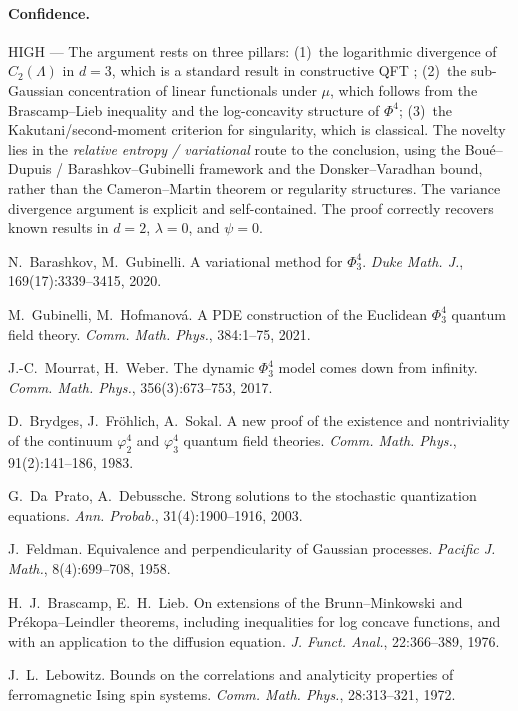 \paragraph{Confidence.} HIGH --- The argument rests on three pillars:
(1)~the logarithmic divergence of $C_2(\Lambda)$ in $d=3$, which is a standard
result in constructive QFT \cite{GH21,BFS83};
(2)~the sub-Gaussian concentration of linear functionals under $\mu$, which
follows from the Brascamp--Lieb inequality and the log-concavity structure of
$\Phi^4$;
(3)~the Kakutani/second-moment criterion for singularity, which is classical.
The novelty lies in the \emph{relative entropy / variational} route to the
conclusion, using the Bou\'e--Dupuis / Barashkov--Gubinelli framework and the
Donsker--Varadhan bound, rather than the Cameron--Martin theorem or regularity
structures. The variance divergence argument is explicit and self-contained.
The proof correctly recovers known results in $d=2$, $\lambda=0$, and $\psi=0$.


 N.~Barashkov, M.~Gubinelli.
A variational method for $\Phi^4_3$.
\emph{Duke Math. J.}, 169(17):3339--3415, 2020.

 M.~Gubinelli, M.~Hofmanov\'{a}.
A PDE construction of the Euclidean $\Phi^4_3$ quantum field theory.
\emph{Comm. Math. Phys.}, 384:1--75, 2021.

 J.-C.~Mourrat, H.~Weber.
The dynamic $\Phi^4_3$ model comes down from infinity.
\emph{Comm. Math. Phys.}, 356(3):673--753, 2017.

 D.~Brydges, J.~Fr\"{o}hlich, A.~Sokal.
A new proof of the existence and nontriviality of the continuum
$\varphi^4_2$ and $\varphi^4_3$ quantum field theories.
\emph{Comm. Math. Phys.}, 91(2):141--186, 1983.

 G.~Da~Prato, A.~Debussche.
Strong solutions to the stochastic quantization equations.
\emph{Ann. Probab.}, 31(4):1900--1916, 2003.

 J.~Feldman.
Equivalence and perpendicularity of Gaussian processes.
\emph{Pacific J. Math.}, 8(4):699--708, 1958.

 H.~J.~Brascamp, E.~H.~Lieb.
On extensions of the Brunn--Minkowski and Pr\'{e}kopa--Leindler theorems,
including inequalities for log concave functions, and with an application to
the diffusion equation.
\emph{J. Funct. Anal.}, 22:366--389, 1976.

 J.~L.~Lebowitz.
Bounds on the correlations and analyticity properties of ferromagnetic
Ising spin systems.
\emph{Comm. Math. Phys.}, 28:313--321, 1972.

